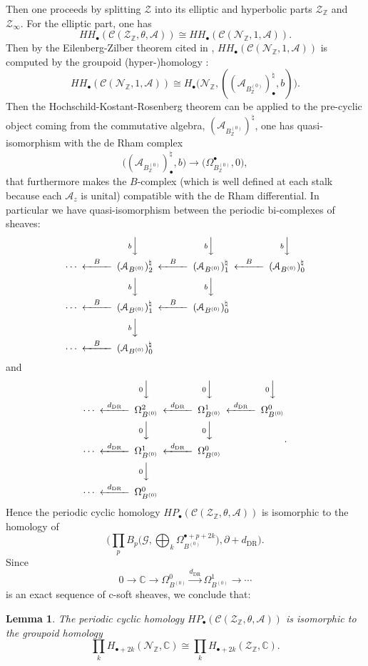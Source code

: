 \documentclass[a4paper]{amsart}
\newcommand{\DR}{\operatorname{DR}}
\newcommand{\CC}{\mathbb C}
\newcommand{\ZZ}{\mathbb Z}
\newcommand{\maA}{\mathcal A}
\newcommand{\maC}{\mathcal C}
\newcommand{\maG}{\mathcal G}
\newcommand{\maN}{\mathcal N}
\newcommand{\maZ}{\mathcal Z}
\newcommand\<{\langle}
\renewcommand\>{\rangle}
\newtheorem{lem}[theorem]{Lemma}
\theoremstyle{definition}
\theoremstyle{remark}
\begin{document}
Then one proceeds by splitting $\maZ$ into its elliptic and hyperbolic parts $\maZ _\ZZ$ and $\maZ _\infty$.
For the elliptic part, one has
$$ H H _\bullet (\maC (\maZ _\ZZ , \theta , \maA)) \cong H H _\bullet (\maC (\maN _\ZZ , 1 , \maA)). $$
Then by the Eilenberg-Zilber theorem cited in \cite{Crainic;EtaleGpoid},
$H H _\bullet (\maC (\maN _\ZZ , 1 , \maA)) $ is computed by the groupoid (hyper-)homology
\cite[Proposition 3.26]{Crainic;EtaleGpoid}:
$$ H H _\bullet (\maC (\maN _\ZZ , 1 , \maA))
\cong H _\bullet \big(\maN _\ZZ , ((\maA _{B ^{(0)}_\ZZ} )^\natural _\bullet , b) \big).$$
Then the Hochschild-Kostant-Rosenberg theorem can be applied to the pre-cyclic object coming from the commutative algebra,
$(\maA _{B ^{(0)}_\ZZ} )^\natural$, one has quasi-isomorphism with the de Rham complex \cite[Lemma 3.5]{Crainic;EtaleGpoid}
$$ \big((\maA _{B ^{(0)}_\ZZ} )^\natural _\bullet , b \big) \to \big( \Omega _{B ^{(0)}_\ZZ} ^\bullet , 0 \big),$$
that furthermore makes the $B$-complex (which is well defined at each stalk because each $\maA _z$ is unital)
compatible with the de Rham differential.
In particular we have quasi-isomorphism between the periodic bi-complexes of sheaves:
$$
\begin{CD}
@. @VbVV @VbVV @VbVV \\
\cdots @<B<< (\maA _{B ^{(0)}} )^\natural_2 @<B<< (\maA _{B ^{(0)}} )^\natural_1 @<B<< (\maA _{B ^{(0)}} )^\natural_0 \\
@. @VbVV @VbVV \\
\cdots @<B<< (\maA _{B ^{(0)}} )^\natural_1 @<B<< (\maA _{B ^{(0)}} )^\natural_0 \\
@. @VbVV \\
\cdots @<B<< (\maA _{B ^{(0)}} )^\natural_0
\end{CD}
$$
and
$$
\begin{CD}
@. @V{0}VV @V{0}VV @V{0}VV \\
\cdots @<{d _{\DR}}<< \Omega ^2 _{B^{(0)}} @<{d _{\DR}}<< \Omega ^1 _{B^{(0)}} @<{d _{\DR}}<< \Omega ^0 _{B^{(0)}} \\
@. @V{0}VV @V{0}VV \\
\cdots @<{d _{\DR}}<< \Omega ^1 _{B^{(0)}} @<{d _{\DR}}<< \Omega ^0 _{B^{(0)}} \\
@. @V{0}VV \\
\cdots @<{d _{\DR}}<< \Omega ^0 _{B^{(0)}}
\end{CD}
.
$$
Hence the periodic cyclic homology $ H P _\bullet (\maC (\maZ _\ZZ , \theta , \maA)) $ is isomorphic to the homology of
$$ \Big( \prod _{p} B _p \big(\maG , \bigoplus _k \Omega ^{\bullet + p + 2k} _{B ^{(0)}} \big), \partial + d _{\DR} \Big). $$
Since
$$ 0 \to \CC \to \Omega^0 _{B ^{(0)}} \xrightarrow{d_{\DR}} \Omega ^1 _{B^{(0)}} \to \cdots $$
is an exact sequence of c-soft sheaves,  we conclude that:
\begin{lem}
\label{Elliptic}
\cite[Theorem 4.4]{Crainic;EtaleGpoid}
The periodic cyclic homology
$ H P _\bullet (\maC (\maZ _\ZZ , \theta , \maA)) $ is isomorphic to the groupoid homology
$$ \prod _k H _{\bullet + 2 k} (\maN _\ZZ , \CC) \cong \prod _{k} H _{\bullet + 2 k} (\maZ _\ZZ , \CC).$$
\end{lem}
\end{document}
